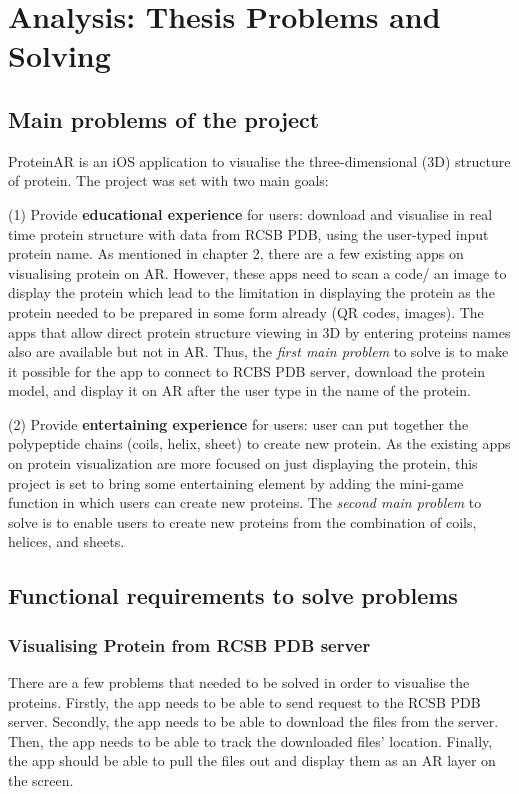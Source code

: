\chapter{Analysis: Thesis Problems and Solving}
\label{ch:analysis2}

\section{Main problems of the project}
ProteinAR is an iOS application to visualise the three-dimensional (3D) structure of protein. The project was set with two main goals:

(1) Provide \textbf{educational experience} for users: download and visualise in real time protein structure with data from RCSB PDB, using the user-typed input protein name. As mentioned in chapter 2, there are a few existing apps on visualising protein on AR. However, these apps need to scan a code/ an image to display the protein which lead to the limitation in displaying the protein as the protein needed to be prepared in some form already (QR codes, images). The apps that allow direct protein structure viewing in 3D by entering proteins names also are available but not in AR. 
Thus, the \emph{first main problem} to solve is to make it possible for the app to connect to RCBS PDB server, download the protein model, and display it on AR after the user type in the name of the protein. 

(2) Provide \textbf{entertaining experience} for users: user can put together the polypeptide chains (coils, helix, sheet) to create new protein. As the existing apps on protein visualization are more focused on just displaying the protein, this project is set to bring some entertaining element by adding the mini-game function in which users can create new proteins. 
The \emph{second main problem} to solve is to enable users to create new proteins from the combination of coils, helices, and sheets. 

\section{Functional requirements to solve problems}
\subsection{Visualising Protein from RCSB PDB server}
There are a few problems that needed to be solved in order to visualise the proteins. 
Firstly, the app needs to be able to send request to the RCSB PDB server. Secondly, the app needs to be able to download the files from the server. Then, the app needs to be able to track the downloaded files’ location. Finally, the app should be able to pull the files out and display them as an AR layer on the screen. 
